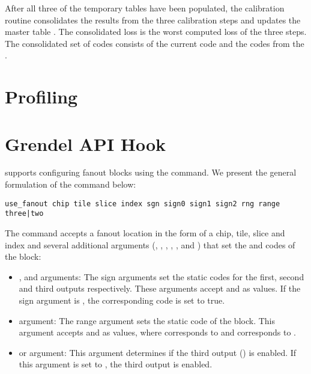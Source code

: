 After all three of the temporary tables have been populated, the calibration
routine consolidates the results from the three calibration steps and updates
the master table . The consolidated loss is the worst computed loss of
the three steps. The consolidated set of codes consists of the current 
code and the  codes from the . 

\section{Profiling}\label{fanout:calib}


\section{Grendel API Hook}

\grendel supports configuring fanout blocks using the  command.
We present the general formulation of the  command below:

\begin{lstlisting}
use_fanout chip tile slice index sgn sign0 sign1 sign2 rng range three|two
\end{lstlisting}

The  command accepts a fanout location in the form of a chip,
tile, slice and index and several additional arguments
(, , , , , and ) that set
the \static and \dynamic codes of the block:
\begin{itemize}
\item {}, and  arguments: The sign arguments set the
   static codes for the first, second and third outputs respectively.
  These arguments accept \tx{+} and \tx{-} as values. If the sign argument is
  \tx{-}, the corresponding  code is set to true.
  \item{} argument: The range argument sets the  static code
    of the block. This argument accepts  and  as values, where
     corresponds to  and  corresponds to
    .
    \item{} or  argument: This argument determines if the third
      output () is enabled. If this argument is set to , the
      third output is enabled.
  \end{itemize}

